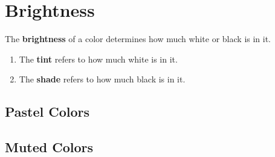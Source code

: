 \section{Brightness}

  \begin{definition}[Brightness]
    The \textbf{brightness} of a color determines how much white or black is in it. 
    \begin{enumerate}
      \item The \textbf{tint} refers to how much white is in it. 
      \item The \textbf{shade} refers to how much black is in it. 
    \end{enumerate}
  \end{definition}

\subsection{Pastel Colors}

\subsection{Muted Colors}
